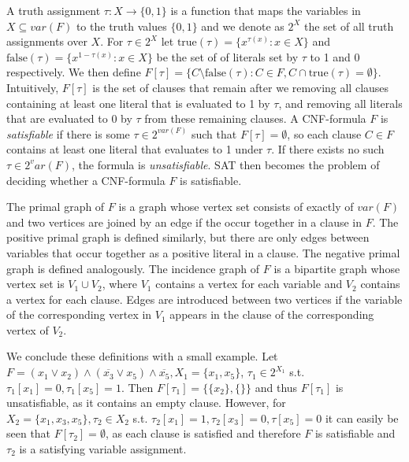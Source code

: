\documentclass[11pt,a4paper]{article}
\theoremstyle{definition}
\theoremstyle{proposition}
\begin{document}
A truth assignment $\tau: X \to \{0,1\}$ is a function that maps the variables in $X \subseteq var(F)$ to the truth values $\{0,1\}$ and we denote as $2^X$ the set of all truth assignments over $X$. For $\tau \in 2^X$ let $\text{true}(\tau) = \{x^{\tau(x)} \colon x \in X\}$ and $\text{false}(\tau) = \{x^{1-\tau(x)} \colon x \in X\}$ be the set of of literals set by $\tau$ to 1 and 0 respectively. We then define $F[\tau] = \{ C \setminus \text{false}(\tau) \colon C \in F, C \cap \text{true}(\tau) = \emptyset \}$. Intuitively, $F[\tau]$ is the set of clauses that remain after we removing all clauses containing at least one literal that is evaluated to 1 by $\tau$, and removing all literals that are evaluated to 0 by $\tau$ from these remaining clauses. A CNF-formula $F$ is \textit{satisfiable} if there is some $\tau \in 2^{var(F)}$ such that $F[\tau] = \emptyset$, so each clause $C \in F$ contains at least one literal that evaluates to 1 under $\tau$. If there exists no such $\tau \in 2^var(F)$, the formula is \textit{unsatisfiable}. SAT then becomes the problem of deciding whether a CNF-formula $F$ is satisfiable. 

The primal graph of $F$ is a graph whose vertex set consists of exactly of $var(F)$ and two vertices are joined by an edge if the occur together in a clause in $F$. The positive primal graph is defined similarly, but there are only edges between variables that occur together as a positive literal in a clause. The negative primal graph is defined analogously. The incidence graph of $F$ is a bipartite graph whose vertex set is $V_1 \cup V_2$, where $V_1$ contains a vertex for each variable and $V_2$ contains a vertex for each clause. Edges are introduced between two vertices if the variable of the corresponding vertex in $V_1$ appears in the clause of the corresponding vertex of $V_2$. 

We conclude these definitions with a small example. Let $F = (x_1 \lor x_2) \land (\overline{x_3} \lor x_5) \land \overline{x_5}, X_1 = \{x_1, x_5\}$, $\tau_1 \in 2^{X_1}$ s.t. $\tau_1[x_1] = 0, \tau_1[x_5] = 1$. Then $F[\tau_1] = \{\{x_2\}, \{\}\}$ and thus $F[\tau_1]$ is unsatisfiable, as it contains an empty clause. However, for $X_2 = \{x_1, x_3, x_5\}, \tau_2 \in X_2$ s.t. $\tau_2[x_1] = 1, \tau_2[x_3] = 0, \tau[x_5] = 0$ it can easily be seen that $F[\tau_2] = \emptyset$, as each clause is satisfied and therefore $F$ is satisfiable and $\tau_2$ is a satisfying variable assignment. \\
\end{document}
